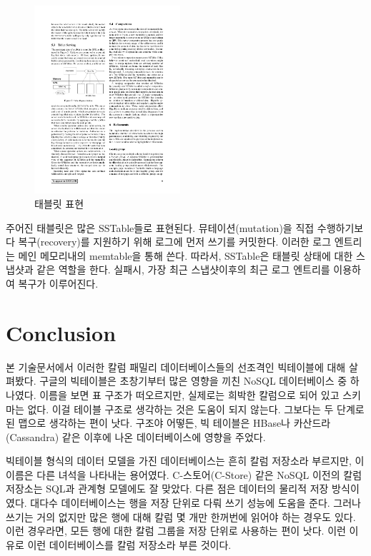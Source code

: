 \documentclass[twocolumn]{article}
\begin{document}
\begin{figure}[htb]
        \centering
        \includegraphics[width=0.48\textwidth]{sstable}
        \caption{    태블릿 표현}
        \label{fig:sstable}
\end{figure}

주어진 태블릿은 많은 SSTable들로 표현된다. 뮤테이션(mutation)을 직접 수행하기보다 복구(recovery)를 지원하기 위해 로그에 먼저 쓰기를 커밋한다. 이러한 로그 엔트리는 메인 메모리내의 memtable을 통해 쓴다. 따라서, SSTable은 태블릿 상태에 대한 스냅샷과 같은 역할을 한다. 
실패시, 가장 최근 스냅샷이후의 최근 로그 엔트리를 이용하여 복구가 이루어진다.



\section{Conclusion}
본 기술문서에서 이러한 칼럼 패밀리 데이터베이스들의 선조격인 빅테이블에 대해 살펴봤다.
구글의 빅테이블은 초창기부터 많은 영향을 끼친 NoSQL 데이터베이스 중 하나였다. 이름을 보면 표 구조가 떠오르지만, 실제로는 희박한 칼럼으로 되어 있고 스키마는 없다. 이걸 테이블 구조로 생각하는 것은 도움이 되지 않는다. 그보다는 두 단계로 된 맵으로 생각하는 편이 낫다.
구조야 어떻든, 빅 테이블은 HBase나 카산드라(Cassandra) 같은 이후에 나온 데이터베이스에 영향을 주었다.

빅테이블 형식의 데이터 모델을 가진 데이터베이스는 흔히 칼럼 저장소라 부르지만, 이 이름은 다른 녀석을 나타내는 용어였다. 
C-스토어(C-Store) 같은 NoSQL 이전의 칼럼 저장소는 SQL과 관계형 모델에도 잘 맞았다. 다른 점은 데이터의 물리적 저장 방식이였다.
대다수 데이터베이스는 행을 저장 단위로 다뤄 쓰기 성능에 도움을 준다. 그러나 쓰기는 거의 없지만 많은 행에 대해 칼럼 몇 개만 한꺼번에 읽어야 하는 경우도 있다. 이런 경우라면, 모든 행에 대한 칼럼 그룹을 저장 단위로 사용하는 편이 낫다. 이런 이유로 이런 데이터베이스를 칼럼 저장소라 부른 것이다.
\end{document}
